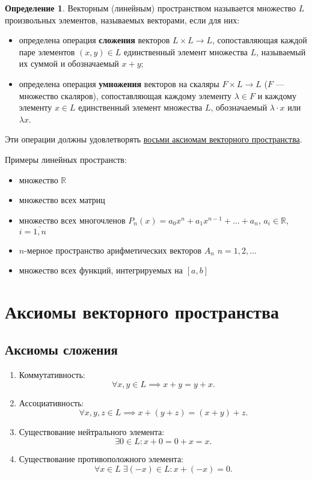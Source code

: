 \documentclass[a5paper, 11pt]{extbook}
\theoremstyle{definition}
\theoremstyle{definition}
\newtheorem{definition}{Определение}[section]
\theoremstyle{definition}
\begin{document}
\begin{definition}
    Векторным (линейным) пространством называется множество \(L\) произвольных элементов, называемых векторами, если для них:
    \begin{itemize}
        \item определена операция \textbf{сложения} векторов \(L \times L \to L\), сопоставляющая каждой паре элементов \((x, y) \in L\) единственный элемент множества \(L\), называемый их суммой и обозначаемый \(x + y\);
        \item определена операция \textbf{умножения} векторов на скаляры \(F \times L \to L\) (\(F\) — множество скаляров), сопоставляющая каждому элементу \(\lambda \in F\) и каждому элементу \(x \in L\) единственный элемент множества \(L\), обозначаемый \(\lambda \cdot x\) или \(\lambda x\).
    \end{itemize}

    Эти операции должны удовлетворять \hyperref[sec:vector-space-axiom]{восьми аксиомам векторного пространства}.
\end{definition}

\noindent Примеры линейных пространств:
\begin{itemize}
    \item множество \(\mathbb{R}\)
    \item множество всех матриц
    \item множество всех многочленов \(P_n (x) = a_0 x^n + a_1 x^{n - 1} + \ldots + a_n\), \(a_i \in \mathbb{R}\), \(i = \overline{1, n}\)
    \item \(n\)-мерное пространство арифметических векторов \(A_n\) \(n = 1, 2, \ldots\)
    \item множество всех функций, интегрируемых на \([a, b]\)
\end{itemize}

\section{Аксиомы векторного пространства}
\label{sec:vector-space-axiom}

\subsection{Аксиомы сложения}

\begin{enumerate}
    \item Коммутативность:
          \[
              \forall x, y \in L \implies x + y = y + x.
          \]
    \item Ассоциативность:
          \[
              \forall x, y, z \in L \implies x + (y + z) = (x + y) + z.
          \]
    \item Существование нейтрального элемента:
          \[
              \exists 0 \in L: x + 0 = 0 + x = x.
          \]
    \item Существование противоположного элемента:
          \[
              \forall x \in L \; \exists (-x) \in L: x + (-x) = 0.
          \]
\end{enumerate}
\end{document}
